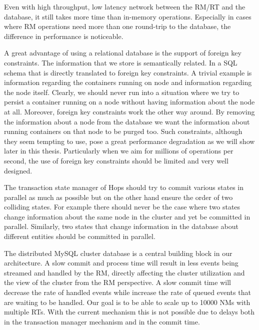 Even with high
throughput, low latency network between the RM/RT and the database, it
still takes more time than in-memory operations. Especially in cases
where RM operations need more than one round-trip to the database, the
difference in performance is noticeable.

A great advantage of using a relational database is the support of
foreign key constraints. The information that we store is semantically
related. In a SQL schema that is directly translated to foreign key
constraints. A trivial example is information regarding the containers
running on node and information regarding the node itself. Clearly, we
should never run into a situation where we try to persist a container
running on a node without having information about the node at
all. Moreover, foreign key constraints work the other way around. By
removing the information about a node from the database we want the
information about running containers on that node to be purged
too. Such constraints, although they seem tempting to use, pose a
great performance degradation as we will show later in this thesis. Particularly when we aim for millions
of operations per second, the use of foreign key constraints should be
limited and very well designed.

The transaction state manager of Hops should try to commit
various states in parallel as much as possible but on the other hand
ensure the order of two colliding states. For example there should
never be the case where two states change information about the same
node in the cluster and yet be committed in parallel. Similarly, two
states that change information in the database about different
entities should be committed in parallel.

The distributed MySQL cluster database is a central building block in our
architecture. A slow commit and process time will result in less events being
streamed and handled by the RM, directly affecting the cluster
utilization and the view of the cluster from the RM perspective.
A slow commit time will decrease the
rate of handled events while increase the rate of queued events that
are waiting to be handled. Our goal is to be able to scale up to 10000 NMs
with multiple RTs. With the current mechanism this is not possible due
to delays both in the transaction manager mechanism and in the commit
time.